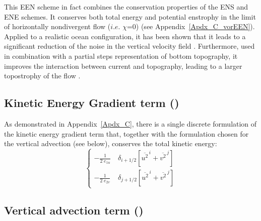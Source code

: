 \documentclass[NEMO_book]{subfiles}
\begin{document}
This EEN scheme in fact combines the conservation properties of the ENS and ENE schemes. 
It conserves both total energy and potential enstrophy in the limit of horizontally 
nondivergent flow ($i.e.$ $\chi$=$0$) (see  Appendix~\ref{Apdx_C_vorEEN}). 
Applied to a realistic ocean configuration, it has been shown that it leads to a significant 
reduction of the noise in the vertical velocity field \citep{Le_Sommer_al_OM09}. 
Furthermore, used in combination with a partial steps representation of bottom topography,
it improves the interaction between current and topography, leading to a larger
topostrophy of the flow  \citep{Barnier_al_OD06, Penduff_al_OS07}. 

\subsection   [Kinetic Energy Gradient term (\textit{dynkeg})]
			{Kinetic Energy Gradient term ()}
\label{DYN_keg}

As demonstrated in Appendix~\ref{Apdx_C}, there is a single discrete formulation 
of the kinetic energy gradient term that, together with the formulation chosen for 
the vertical advection (see below), conserves the total kinetic energy:
\begin{equation} \label{Eq_dynkeg}
\left\{ \begin{aligned}
 -\frac{1}{2 \; e_{1u} }  & \ \delta _{i+1/2} \left[ {\overline {u^2}^{\,i} + \overline{v^2}^{\,j}} \right]   \\
 -\frac{1}{2 \; e_{2v} }  & \ \delta _{j+1/2} \left[ {\overline {u^2}^{\,i} + \overline{v^2}^{\,j}} \right]    
\end{aligned} \right.
\end{equation} 

\subsection   [Vertical advection term (\textit{dynzad}) ]
			{Vertical advection term () }
\label{DYN_zad}
\end{document}
